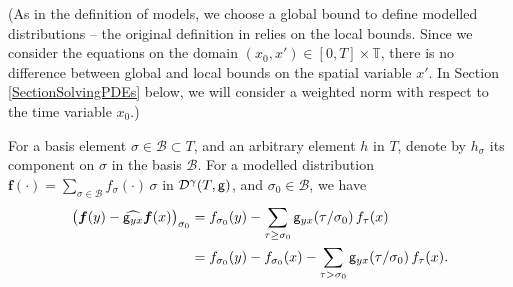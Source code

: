 \documentclass[10pt, reqno]{amsart}
\numberwithin{subsection}{section}
\numberwithin{subsubsection}{subsection}
\numberwithin{equation}{section} %
\theoremstyle{mystyle}
\theoremstyle{mystyle2}
\theoremstyle{mystyle3}
\newcommand{\bsf}{\boldsymbol{f}}
\newcommand{\ssk}{\smallskip}
\newcommand{\bbT}{\mathbb{T}}
\newcommand{\mcB}{\mathcal{B}}
\newcommand{\mcD}{\mathcal{D}}
\begin{document}
\ssk


(As in the definition of models, we choose a global bound to define modelled distributions -- the original definition in \cite[Section 2]{Hai14} relies on the local bounds. Since we consider the equations on the domain $(x_0,x')\in [0,T]\times \bbT$, there is no difference between global and local bounds on the spatial variable $x'$. In Section \ref{SectionSolvingPDEs} below, we will consider a weighted norm with respect to the time variable $x_0$.)

For a basis element $\sigma\in\mcB\subset T$, and an arbitrary element $h$ in $T$, denote by $h_\sigma$ its component on $\sigma$ in the basis $\mcB$. For a modelled distribution $\bsf(\cdot) = \sum_{\sigma\in\mcB} f_\sigma(\cdot) \, \sigma$ in $\mcD^\gamma(T, {\sf g})$, and $\sigma_0\in\mcB$, we have
\begin{equation} \label{EqIncrementMdF} \begin{split}
\big(\bsf(y) - \widehat{{\sf g}_{yx}}\bsf(x)\big)_{\sigma_0} &= f_{\sigma_0}(y) - \sum_{\tau \geq \sigma_0} {\sf g}_{yx}(\tau/\sigma_0) \, f_\tau(x)  \\
&= f_{\sigma_0}(y) - f_{\sigma_0}(x) - \sum_{\tau > \sigma_0} {\sf g}_{yx}(\tau/\sigma_0) \, f_\tau(x).
\end{split} \end{equation}

\medskip
\end{document}
